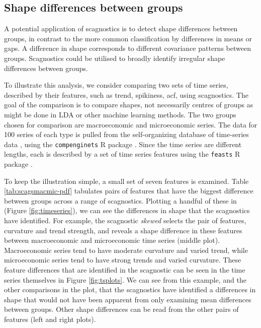 \subsection{Shape differences between groups}\label{shape-differences-between-groups}

A potential application of scagnostics is to detect shape differences between groups, in contrast to the more common classification by differences in means or gaps. A difference in shape corresponds to different covariance patterns between groups. Scagnostics could be utilised to broadly identify irregular shape differences between groups.

To illustrate this analysis, we consider comparing two sets of time series, described by their features, such as trend, spikiness, acf, using scagnostics. The goal of the comparison is to compare shapes, not necessarily centres of groups as might be done in LDA or other machine learning methods. The two groups chosen for comparison are macroeconomic and microeconomic series. The data for 100 series of each type is pulled from the self-organizing database of time-series data \citep{sots}, using the \texttt{compenginets} R package \citep{compenginets}. Since the time series are different lengths, each is described by a set of time series features \citep[chapter 4 of][]{fpp} using the \texttt{feasts} R package \citep{feasts}.

To keep the illustration simple, a small set of seven features is examined. Table \ref{tab:scagsmacmic-pdf} tabulates pairs of features that have the biggest difference between groups across a range of scagnostics. Plotting a handful of these in (Figure \ref{fig:timeseries}), we can see the differences in shape that the scagnostics have identified. For example, the scagnostic \emph{skewed} selects the pair of features, curvature and trend strength, and reveals a shape difference in these features between macroeconomic and microeconomic time series (middle plot). Macroeconomic series tend to have moderate curvature and varied trend, while microeconomic series tend to have strong trends and varied curvature. These feature differences that are identified in the scagnostic can be seen in the time series themselves in Figure \ref{fig:tsplots}. We can see from this example, and the other comparisons in the plot, that the scagnostics have identified a differences in shape that would not have been apparent from only examining mean differences between groups. Other shape differences can be read from the other pairs of features (left and right plots).

